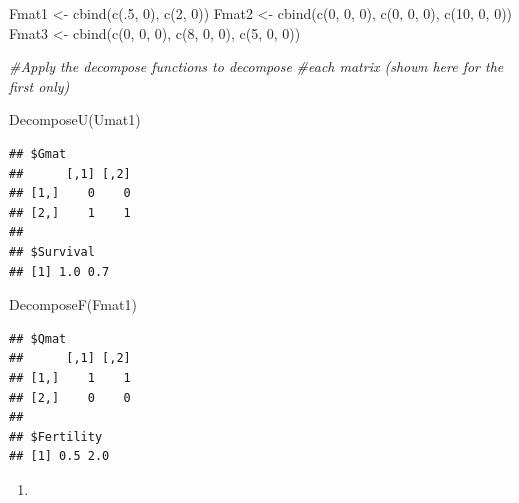 \documentclass[
]{book}
\newenvironment{Shaded}{\begin{snugshade}}{\end{snugshade}}
\newcommand{\CommentTok}[1]{\textcolor[rgb]{0.56,0.35,0.01}{\textit{#1}}}
\newcommand{\DecValTok}[1]{\textcolor[rgb]{0.00,0.00,0.81}{#1}}
\newcommand{\FunctionTok}[1]{\textcolor[rgb]{0.00,0.00,0.00}{#1}}
\newcommand{\NormalTok}[1]{#1}
\newcommand{\OtherTok}[1]{\textcolor[rgb]{0.56,0.35,0.01}{#1}}
\providecommand{\tightlist}{%
  \setlength{\itemsep}{0pt}\setlength{\parskip}{0pt}}
\begin{document}
\begin{Shaded}
\begin{Highlighting}[]
\NormalTok{Fmat1 }\OtherTok{\textless{}{-}} \FunctionTok{cbind}\NormalTok{(}\FunctionTok{c}\NormalTok{(.}\DecValTok{5}\NormalTok{, }\DecValTok{0}\NormalTok{), }
               \FunctionTok{c}\NormalTok{(}\DecValTok{2}\NormalTok{, }\DecValTok{0}\NormalTok{))}
\NormalTok{Fmat2 }\OtherTok{\textless{}{-}} \FunctionTok{cbind}\NormalTok{(}\FunctionTok{c}\NormalTok{(}\DecValTok{0}\NormalTok{, }\DecValTok{0}\NormalTok{, }\DecValTok{0}\NormalTok{), }
               \FunctionTok{c}\NormalTok{(}\DecValTok{0}\NormalTok{, }\DecValTok{0}\NormalTok{, }\DecValTok{0}\NormalTok{), }
               \FunctionTok{c}\NormalTok{(}\DecValTok{10}\NormalTok{, }\DecValTok{0}\NormalTok{, }\DecValTok{0}\NormalTok{))}
\NormalTok{Fmat3 }\OtherTok{\textless{}{-}} \FunctionTok{cbind}\NormalTok{(}\FunctionTok{c}\NormalTok{(}\DecValTok{0}\NormalTok{, }\DecValTok{0}\NormalTok{, }\DecValTok{0}\NormalTok{), }
               \FunctionTok{c}\NormalTok{(}\DecValTok{8}\NormalTok{, }\DecValTok{0}\NormalTok{, }\DecValTok{0}\NormalTok{), }
               \FunctionTok{c}\NormalTok{(}\DecValTok{5}\NormalTok{, }\DecValTok{0}\NormalTok{, }\DecValTok{0}\NormalTok{))}

\CommentTok{\#Apply the decompose functions to decompose }
\CommentTok{\#each matrix (shown here for the first only)}

\FunctionTok{DecomposeU}\NormalTok{(Umat1)}
\end{Highlighting}
\end{Shaded}

\begin{verbatim}
## $Gmat
##      [,1] [,2]
## [1,]    0    0
## [2,]    1    1
## 
## $Survival
## [1] 1.0 0.7
\end{verbatim}

\begin{Shaded}
\begin{Highlighting}[]
\FunctionTok{DecomposeF}\NormalTok{(Fmat1)}
\end{Highlighting}
\end{Shaded}

\begin{verbatim}
## $Qmat
##      [,1] [,2]
## [1,]    1    1
## [2,]    0    0
## 
## $Fertility
## [1] 0.5 2.0
\end{verbatim}

\begin{enumerate}
\def\labelenumi{\arabic{enumi}.}
\setcounter{enumi}{2}
\tightlist
\item
\end{enumerate}
\end{document}
